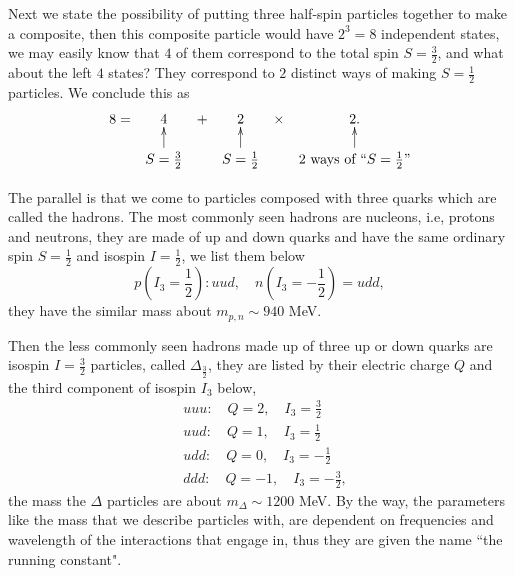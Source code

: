 \documentclass{article}
\newcommand{\be}{\begin{equation}}
\newcommand{\ee}{\end{equation}}
\renewcommand{\1}{\left}
\renewcommand{\2}{\right}
\begin{document}
Next we state the possibility of putting three half-spin particles together to make a composite, then this composite particle would have $2^3=8$ independent states, we may easily know  that $4$ of them correspond to the total spin $S=\frac 3 2$, and what about the left $4$ states? They correspond to $2$ distinct ways of making $S=\frac 1 2$ particles. We conclude this as
\be
\begin{gathered}
\xymatrix@R=3ex@C=1ex{
8=&4&+&2&\times& 2.\\
 &S=\frac 3 2\ar[u]&&S=\frac 1 2\ar[u]&& 2\ \text{ways of}\ ``S=\frac1 2"\ar[u]\\
}\end{gathered}
\ee

The parallel is that we come to particles composed with three quarks which are called the hadrons. The most commonly seen hadrons are nucleons, i.e, protons and neutrons, they are made of up and down quarks and have the same ordinary spin $S=\frac1 2$ and isospin $I=\frac1 2$, we list them below
\be
p(I_3=\frac1 2): uud, \quad n(I_3=-\frac1 2)=udd,
\ee
they have the similar mass about $m_{p,n}\sim 940$ MeV.

Then the less commonly seen hadrons made up of three up or down quarks are isospin $I=\frac3 2$ particles, called $\Delta_{\frac3 2}$, they are listed by their electric charge $Q$ and the third component of isospin $I_3$ below,
\be\begin{split}
&uuu:\quad Q=2,\quad I_3=\frac3 2\\
&uud:\quad Q=1,\quad I_3=\frac1 2\\
&udd:\quad Q=0,\quad I_3=-\frac1 2\\
&ddd:\quad Q=-1,\quad I_3=-\frac3 2,
\end{split}\ee
the mass the $\Delta$ particles are about $m_\Delta\sim 1200$ MeV. By the way, the parameters like the mass that we describe particles with, are dependent on frequencies and wavelength of the interactions that engage in, thus they are given the name ``the running constant".

\newpage
\end{document}
